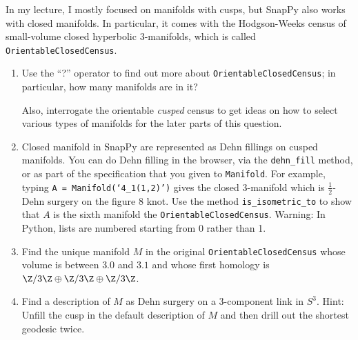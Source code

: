 \documentclass[tikz, a4paper]{nmd/hw}
\begin{document}
\begin{problems}
\item In my lecture, I mostly focused on manifolds with cusps, but
  SnapPy also works with closed manifolds.  In particular, it comes
  with the Hodgson-Weeks census of small-volume closed hyperbolic
  3-manifolds, which is called \texttt{OrientableClosedCensus}.

  \begin{enumerate}
    \item Use the ``?'' operator to find out more about
      \texttt{OrientableClosedCensus}; in particular, how many
      manifolds are in it?  

      Also, interrogate the orientable \emph{cusped} census to get
      ideas on how to select various types of manifolds for the later
      parts of this question.
      
    \item Closed manifold in SnapPy are represented as Dehn fillings
      on cusped manifolds.  You can do Dehn filling in the browser,
      via the \texttt{dehn\_fill} method, or as part of the
      specification that you given to \texttt{Manifold}.  For example,
      typing \texttt{A = Manifold(`4\_1(1,2)')} gives the closed
      3-manifold which is $\frac{1}{2}$-Dehn surgery on the figure 8
      knot.  Use the method \texttt{is\_isometric\_to} to show that
      $A$ is the sixth manifold the \texttt{OrientableClosedCensus}.
      Warning: In Python, lists are numbered starting from 0
      rather than 1.

    \item Find the unique manifold $M$ in the original
      \texttt{OrientableClosedCensus} whose volume is between $3.0$
      and $3.1$ and whose first homology is
      $\Z/3\Z \oplus \Z/3\Z \oplus \Z/3\Z$.

    \item Find a description of $M$ as Dehn surgery on a 3-component
      link in $S^3$.  Hint: Unfill the cusp in the default description
      of $M$ and then drill out the shortest geodesic twice.  

  \end{enumerate}



\end{problems}
\end{document}

